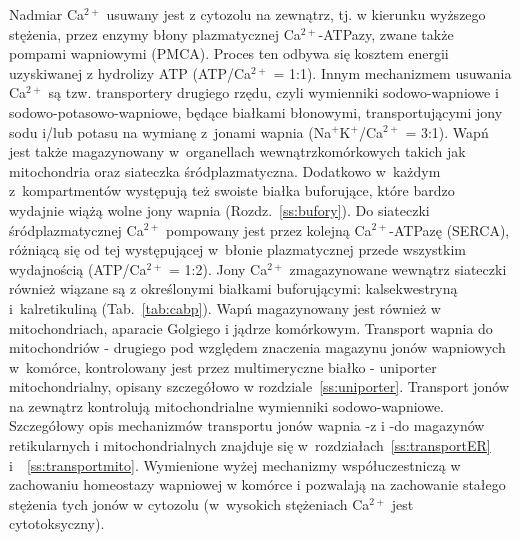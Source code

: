 Nadmiar Ca$^{2+}$ usuwany jest z cytozolu na zewnątrz, tj. w kierunku wyższego stężenia, przez enzymy błony plazmatycznej Ca$^{2+}$-ATPazy, zwane także pompami wapniowymi (PMCA). Proces ten odbywa się kosztem energii uzyskiwanej z hydrolizy ATP (ATP/Ca$^{2+}$ = 1:1). Innym mechanizmem usuwania Ca$^{2+}$ są tzw. transportery drugiego rzędu, czyli wymienniki sodowo-wapniowe i sodowo-potasowo-wapniowe, będące białkami błonowymi, transportującymi jony sodu i/lub potasu na wymianę z~jonami wapnia (Na$^+$K$^+$/Ca$^{2+}$ = 3:1). Wapń jest także magazynowany w~organellach wewnątrzkomórkowych takich jak mitochondria oraz siateczka śródplazmatyczna. Dodatkowo w~każdym z~kompartmentów występują też swoiste białka buforujące, które bardzo wydajnie wiążą wolne jony wapnia (Rozdz.~\ref{ss:bufory}). Do siateczki śródplazmatycznej Ca$^{2+}$ pompowany jest przez kolejną Ca$^{2+}$-ATPazę (SERCA), różniącą się od tej występującej w~błonie plazmatycznej przede wszystkim wydajnością (ATP/Ca$^{2+}$ = 1:2). Jony Ca$^{2+}$ zmagazynowane wewnątrz siateczki również wiązane są z określonymi białkami buforującymi: kalsekwestryną i~kalretikuliną (Tab.~\ref{tab:cabp}). Wapń magazynowany jest również w mitochondriach, aparacie Golgiego i jądrze komórkowym. Transport wapnia do mitochondriów - drugiego pod względem znaczenia magazynu jonów wapniowych w~komórce, kontrolowany jest przez multimeryczne białko - uniporter mitochondrialny, opisany szczegółowo w rozdziale~\ref{ss:uniporter}. Transport jonów na zewnątrz kontrolują mitochondrialne wymienniki sodowo-wapniowe. Szczegółowy opis mechanizmów transportu jonów wapnia -z i -do magazynów retikularnych i mitochondrialnych znajduje się w~rozdziałach~\ref{ss:transportER} i~~\ref{ss:transportmito}. Wymienione wyżej mechanizmy współuczestniczą w zachowaniu homeostazy wapniowej w komórce i pozwalają na zachowanie stałego stężenia tych jonów w cytozolu (w~wysokich stężeniach Ca$^{2+}$ jest cytotoksyczny). 

